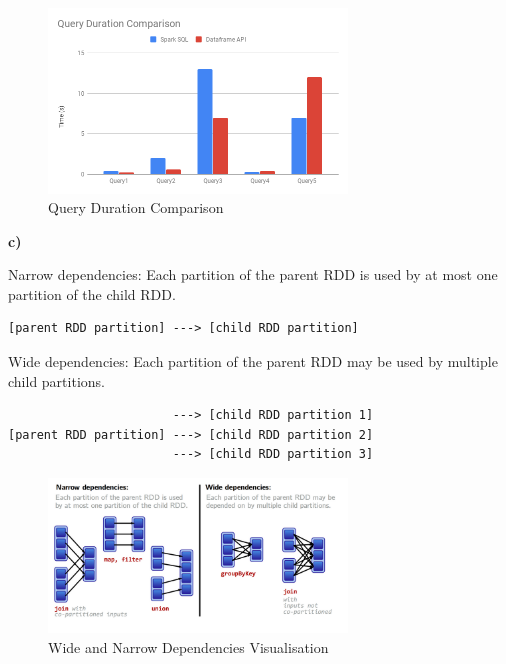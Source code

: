 \documentclass[]{article}
\begin{document}
\begin{figure}[h]

{\centering \includegraphics[width=300px]{images/Query Duration Comparison} 

}

\caption{\label{fig:figs}Query Duration Comparison}\label{fig:unnamed-chunk-11}
\end{figure}

\textbf{c)}

Narrow dependencies: Each partition of the parent RDD is used by at most
one partition of the child RDD.

\begin{verbatim}
[parent RDD partition] ---> [child RDD partition]
\end{verbatim}

Wide dependencies: Each partition of the parent RDD may be used by
multiple child partitions.

\begin{verbatim}
                       ---> [child RDD partition 1]
[parent RDD partition] ---> [child RDD partition 2]
                       ---> [child RDD partition 3]
\end{verbatim}

\begin{figure}[h]

{\centering \includegraphics[width=300px]{images/Dependencies} 

}

\caption{\label{fig:figs}Wide and Narrow Dependencies Visualisation}\label{fig:unnamed-chunk-12}
\end{figure}
\end{document}
